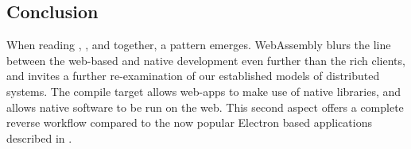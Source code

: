 










\subsection{Conclusion}
\label{sec:background-web-conclusion}

When reading , , and  together, a pattern emerges. 
WebAssembly blurs the line between the web-based and native development even further than the rich clients, and invites a further re-examination of our established models of distributed systems.
The compile target allows web-apps to make use of native libraries, and allows native software to be run on the web.
This second aspect offers a complete reverse workflow compared to the now popular Electron based applications described in .
 
